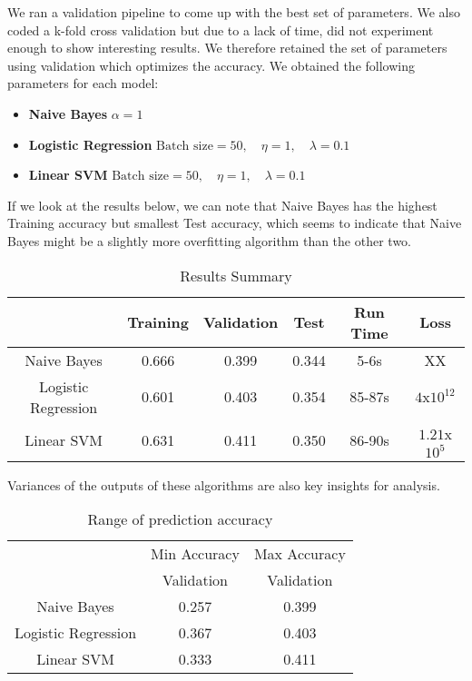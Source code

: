 \documentclass[11pt]{article}
\begin{document}
\noindent We ran a validation pipeline to come up with the best set of parameters. We also coded a k-fold cross validation but due to a lack of time, did not experiment enough to show interesting results. We therefore retained the set of parameters using validation which optimizes the accuracy. We obtained the following parameters for each model:

\begin{itemize}
	\item \textbf{Naive Bayes} $\alpha = 1$
	\item \textbf{Logistic Regression} $\text{Batch size} = 50,\quad \eta = 1, \quad \lambda = 0.1$
	\item \textbf{Linear SVM} $\text{Batch size} = 50,\quad \eta = 1, \quad \lambda = 0.1$\\
\end{itemize}

If we look at the results below, we can note that Naive Bayes has the highest Training accuracy but smallest Test accuracy, which seems to indicate that Naive Bayes might be a slightly more overfitting algorithm than the other two.\\

\begin{table}[h!]
\centering
\caption{Results Summary}
\label{Results Summary}
\begin{tabular}{c|c|c|c|c|c|}
\cline{2-6}
\multicolumn{1}{l|}{}                     & Training & Validation & Test  & Run Time & Loss                      \\ \hline
\multicolumn{1}{|c|}{Naive Bayes}         & 0.666    & 0.399      & 0.344 & 5-6s     &    XX                       \\ \cline{1-1}
\multicolumn{1}{|c|}{Logistic Regression} & 0.601    & 0.403      & 0.354 & 85-87s   & $4$x$10^12$   \\ \cline{1-1}
\multicolumn{1}{|c|}{Linear SVM}          & 0.631    & 0.411      & 0.350 & 86-90s   & $1.21$x$10^5$ \\ \hline
\end{tabular}
\end{table}

Variances of the outputs of these algorithms are also key insights for analysis.\\

\begin{table}[h!]
\centering
\caption{Range of prediction accuracy}
\label{my-label}
\begin{tabular}{c|c|c|}
\cline{2-3}
\multicolumn{1}{l|}{}                     & Min Accuracy & Max Accuracy \\ \cline{2-3} 
\multicolumn{1}{l|}{}                     & Validation   & Validation   \\ \hline
\multicolumn{1}{|c|}{Naive Bayes}         & 0.257        & 0.399        \\ \hline
\multicolumn{1}{|c|}{Logistic Regression} & 0.367        & 0.403        \\ \hline
\multicolumn{1}{|c|}{Linear SVM}          & 0.333        & 0.411        \\ \hline
\end{tabular}
\end{table}
\end{document}
